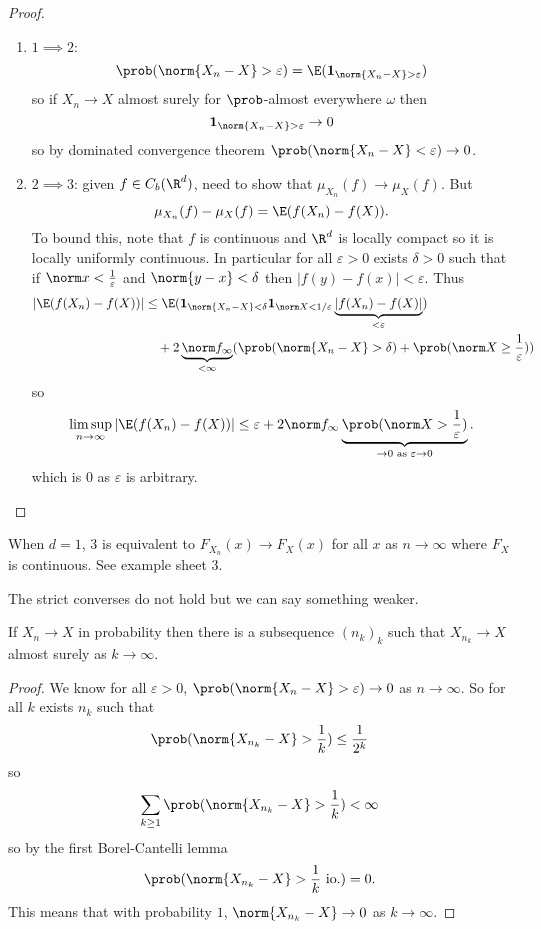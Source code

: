 \documentclass[a4paper]{article}
\renewcommand{\P}{\prob} %
\begin{document}
\begin{proof}\leavevmode
  \begin{enumerate}
  \item \(1 \implies 2\):
    \[
      \P(\norm{X_n - X} > \varepsilon) = \E(\mathbf 1_{\norm{X_n - X} > \varepsilon})
    \]
    so if \(X_n \to X\) almost surely for \(\P\)-almost everywhere \(\omega\) then
    \[
      \mathbf 1_{\norm{X_n - X} > \varepsilon} \to 0
    \]
    so by dominated convergence theorem \(\P(\norm{X_n - X} < \varepsilon) \to 0\).
  \item \(2 \implies 3\): given \(f \in C_b(\R^d)\), need to show that \(\mu_{X_n}(f) \to \mu_X(f)\). But
    \[
      \mu_{X_n}(f) - \mu_X(f) = \E(f(X_n) - f(X)).
    \]
    To bound this, note that \(f\) is continuous and \(\R^d\) is locally compact so it is locally uniformly continuous. In particular for all \(\varepsilon > 0\) exists \(\delta > 0\) such that if \(\norm x < \frac{1}{\varepsilon}\) and \(\norm{y - x} < \delta\) then \(|f(y) - f(x)| < \varepsilon\). Thus
    \begin{align*}
      |\E(f(X_n)  - f(X))|
      &\leq \E(\mathbf 1_{\norm{X_n - X} < \delta} \mathbf 1_{\norm X < 1/\varepsilon} \underbrace{|f(X_n) - f(X)|}_{< \varepsilon}) \\
      &\quad + 2 \underbrace{\norm f_\infty}_{< \infty} (\P(\norm{X_n - X} > \delta) + \P(\norm X \geq \frac{1}{\varepsilon}))
    \end{align*}
    so
    \[
      \limsup_{n \to \infty} |\E(f(X_n)  - f(X))|
      \leq \varepsilon + 2 \norm f_\infty \underbrace{\P(\norm X > \frac{1}{\varepsilon})}_{\to 0 \text{ as } \varepsilon \to 0}.
    \]
    which is \(0\) as \(\varepsilon\) is arbitrary.
  \end{enumerate}
\end{proof}

\begin{remark}
  When \(d = 1\), 3 is equivalent to \(F_{X_n}(x) \to F_X(x)\) for all \(x\) as \(n \to \infty\) where \(F_X\) is continuous. See example sheet 3.
\end{remark}

The strict converses do not hold but we can say something weaker.

\begin{proposition}
  If \(X_n \to X\) in probability then there is a subsequence \((n_k)_k\) such that \(X_{n_k} \to X\) almost surely as \(k \to \infty\).
\end{proposition}

\begin{proof}
  We know for all \(\varepsilon > 0\), \(\P(\norm{X_n - X} > \varepsilon) \to 0\) as \(n \to \infty\). So for all \(k\) exists \(n_k\) such that
  \[
    \P(\norm{X_{n_k} - X} > \frac{1}{k}) \leq \frac{1}{2^k}
  \]
  so
  \[
    \sum_{k \geq 1} \P(\norm{X_{n_k} - X} > \frac{1}{k}) < \infty
  \]
  so by the first Borel-Cantelli lemma
  \[
    \P(\norm{X_{n_k} - X} > \frac{1}{k} \text{ io.}) = 0.
  \]
  This means that with probability \(1\), \(\norm{X_{n_k} - X} \to 0\) as \(k \to \infty\).
\end{proof}
\end{document}
